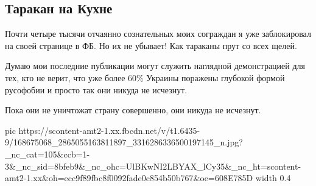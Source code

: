  
 
 
 
 

\subsection{Таракан на Кухне}
\label{sec:04_04_2021.fb.volga_vasilij.1.tarakan}

Почти четыре тысячи отчаянно сознательных моих сограждан я уже заблокировал на
своей странице в ФБ. Но их не убывает! Как тараканы прут со всех щелей.

Думаю мои последние публикации могут служить наглядной демонстрацией для тех,
кто не верит, что уже более 60\% Украины поражены глубокой формой русофобии и
просто так они никуда не исчезнут. 

Пока они не уничтожат страну совершенно, они никуда не исчезнут.

\ifcmt
  pic https://scontent-amt2-1.xx.fbcdn.net/v/t1.6435-9/168675068_2865055163811897_3316286336500197145_n.jpg?_nc_cat=105&ccb=1-3&_nc_sid=8bfeb9&_nc_ohc=UlBKwNI2LBYAX_lCy35&_nc_ht=scontent-amt2-1.xx&oh=ecc9f89fbc8f0092fade0c854b50b767&oe=608E785D
  width 0.4
\fi

